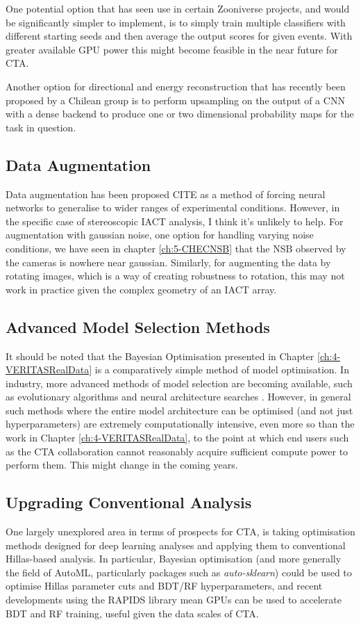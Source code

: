 One potential option that has seen use in certain Zooniverse projects, and would be significantly simpler to implement, is to simply train multiple classifiers with different starting seeds and then average the output scores for given events. With greater available GPU power this might become feasible in the near future for CTA.

Another option for directional and energy reconstruction that has recently been proposed by a Chilean group is to perform upsampling on the output of a CNN with a dense backend to produce one or two dimensional probability maps for the task in question.

\subsection{Data Augmentation}
Data augmentation has been proposed CITE as a method of forcing neural networks to generalise to wider ranges of experimental conditions. However, in the specific case of stereoscopic IACT analysis, I think it's unlikely to help. For augmentation with gaussian noise, one option for handling varying noise conditions, we have seen in chapter \ref{ch:5-CHECNSB} that the NSB observed by the cameras is nowhere near gaussian. Similarly, for augmenting the data by rotating images, which is a way of creating robustness to rotation, this may not work in practice given the complex geometry of an IACT array.
\subsection{Advanced Model Selection Methods}

It should be noted that the Bayesian Optimisation presented in Chapter \ref{ch:4-VERITASRealData} is a comparatively simple method of model optimisation. In industry, more advanced methods of model selection are becoming available, such as evolutionary algorithms \cite{evodeep} and neural architecture searches \cite{neural}. However, in general such methods where the entire model architecture can be optimised (and not just hyperparameters) are extremely computationally intensive, even more so than the work in Chapter \ref{ch:4-VERITASRealData}, to the point at which end users such as the CTA collaboration cannot reasonably acquire sufficient compute power to perform them. This might change in the coming years.

\subsection{Upgrading Conventional Analysis}
One largely unexplored area in terms of prospects for CTA, is taking optimisation methods designed for deep learning analyses and applying them to conventional Hillas-based analysis. In particular, Bayesian optimisation (and more generally the field of AutoML, particularly packages such as \textit{auto-sklearn}\cite{autosklearn}) could be used to optimise Hillas parameter cuts and BDT/RF hyperparameters, and recent developments using the RAPIDS \cite{rapids} library mean GPUs can be used to accelerate BDT and RF training, useful given the data scales of CTA.


